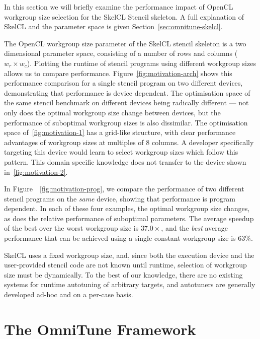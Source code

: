 \documentclass[nonatbib,preprint,9pt]{sigplanconf}
\begin{document}
In this section we will briefly examine the performance impact of
OpenCL workgroup size selection for the SkelCL Stencil skeleton. A
full explanation of SkelCL and the parameter space is given
Section~\ref{sec:omnitune-skelcl}.

The OpenCL workgroup size parameter of the SkelCL stencil skeleton is
a two dimensional parameter space, consisting of a number of rows and
columns ($w_r \times w_c$). Plotting the runtime of stencil programs
using different workgroup sizes allows us to compare
performance. Figure~\ref{fig:motivation-arch} shows this performance
comparison for a single stencil program on two different devices,
demonstrating that performance is device dependent. The optimisation
space of the same stencil benchmark on different devices being
radically different --- not only does the optimal workgroup size
change between devices, but the performance of suboptimal workgroup
sizes is also dissimilar. The optimisation space
of~\ref{fig:motivation-1} has a grid-like structure, with clear
performance advantages of workgroup sizes at multiples of 8 columns. A
developer specifically targeting this device would learn to select
workgroup sizes which follow this pattern. This domain specific
knowledge does not transfer to the device shown
in~\ref{fig:motivation-2}.

In Figure~~\ref{fig:motivation-prog}, we compare the performance of
two different stencil programs on the \emph{same} device, showing that
performance is program dependent. In each of these four examples, the
optimal workgroup size changes, as does the relative performance of
suboptimal parameters. The average speedup of the best over the worst
workgroup size is $37.0\times$, and the \emph{best} average
performance that can be achieved using a single constant workgroup
size is 63\%.

SkelCL uses a fixed workgroup size, and, since both the execution
device and the user-provided stencil code are not known until runtime,
selection of workgroup size must be dynamically. To the best of our
knowledge, there are no existing systems for runtime autotuning of
arbitrary targets, and autotuners are generally developed ad-hoc and
on a per-case basis.


\section{The OmniTune Framework}\label{sec:autotune}
\end{document}
